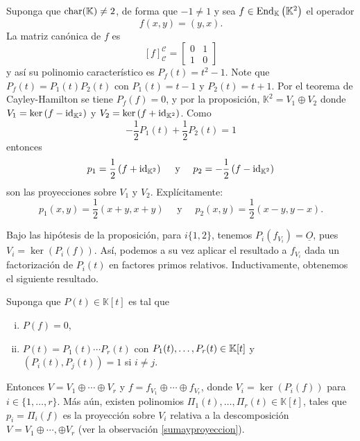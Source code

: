 \begin{ejem}
Suponga que $\operatorname{char}(\mathbb{K})\ne 2$, de forma que $-1\ne 1$ y sea $f\in\operatorname{End}_\mathbb{K}\left(\mathbb{K}^2\right)$ el operador
$$f(x,y)=(y,x).$$
La matriz canónica de $f$ es
$$\left[ f\right]^{\mathcal{C}}_{\mathcal{C}}=
\left[\begin{array}{rr}
0 & 1\\ 1 & 0
\end{array}\right]$$
y así su polinomio característico es $P_f(t)=t^2-1$. Note que $P_f(t)=P_1(t)P_2(t)$ con $P_1(t)=t-1$ y $P_2(t)=t+1$. Por el teorema de Cayley-Hamilton se tiene $P_f(f)=0$, y por la proposición, $\mathbb{K}^2=V_1\oplus V_2$ donde $V_1=\ker\left(f-\operatorname{id}_{\mathbb{K}^2}\right)$ y $V_2=\ker\left(f+\operatorname{id}_{\mathbb{K}^2}\right)$. Como
$$-\frac{1}{2}P_1(t)+\frac{1}{2}P_2(t)=1$$
entonces
$$p_1=\frac{1}{2}\left(f+\operatorname{id}_{\mathbb{K}^2}\right)\quad\textrm{ y }\quad p_2=-\frac{1}{2}\left(f-\operatorname{id}_{\mathbb{K}^2}\right)$$
son las proyecciones sobre $V_1$ y $V_2$. Expl\'icitamente:
$$p_1(x,y)=\frac{1}{2}(x+y,x+y)\quad\textrm{ y }\quad p_2(x,y)=\frac{1}{2}(x-y,y-x).$$
\end{ejem}

\begin{obs}
Bajo las hipótesis de la proposición, para $i\{1,2\}$, tenemos $P_i(f_{V_i})=\underline{O}$, pues $V_i=\ker\left(P_i(f)\right)$. As\'i, podemos a su vez aplicar el resultado a $f_{V_i}$ dada un factorización de $P_i(t)$ en factores primos relativos. Inductivamente, obtenemos el siguiente resultado. 
\end{obs}

\begin{prop}\label{propdescomp}
  Suponga que $P(t)\in \mathbb{K}[t]$ es tal que
  \begin{enumerate}[(i)]
    \item $P(f)=0$,
    \item $P(t)=P_1(t)\cdots P_r(t)$ con $P_1(t),\ldots,P_r(t)\in\mathbb{K}[t]$ y $\left(P_i(t),P_j(t)\right)=1$ si $i\ne j$.
  \end{enumerate}
  Entonces $V=V_1\oplus\cdots\oplus V_r$ y $f=f_{V_1}\oplus\cdots\oplus f_{V_r}$, donde $V_i=\ker\left(P_i(f)\right)$ para $i\in\{1,\ldots,r\}$. M\'as a\'un, existen polinomios $\Pi_1(t),\ldots,\Pi_r(t)\in \mathbb{K}[t]$, tales que $p_i=\Pi_i(f)$ es la proyección sobre $V_i$ relativa a la descomposición $V=V_1\oplus\cdots,\oplus V_r$ (ver la observación \ref{sumayproyeccion}).
\end{prop}

